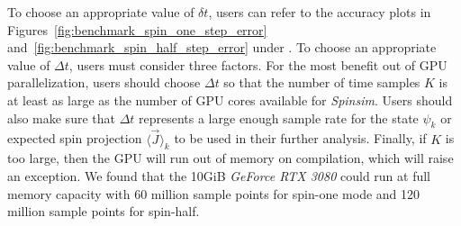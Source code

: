 \documentclass{jors}
\newcommand{\note}[1]{\textcolor{green}{\texttt{[NOTE: #1]}}}
\begin{document}
		To choose an appropriate value of $ \delta t $, users can refer to the accuracy plots in Figures~\ref{fig:benchmark_spin_one_step_error} and~\ref{fig:benchmark_spin_half_step_error} under \emph{}. %
		To choose an appropriate value of $ \Delta t $, users must consider three factors.
		For the most benefit out of GPU parallelization, users should choose $ \Delta t $ so that the number of time samples $ K $ is at least as large as the number of GPU cores available for \emph{Spinsim}.
		Users should also make sure that $ \Delta t $ represents a large enough sample rate for the state $ \psi_k $ or expected spin projection $ \langle \overrightarrow{J}\rangle_k $ to be used in their further analysis.
		Finally, if $ K $ is too large, then the GPU will run out of memory on compilation, which will raise an exception. %
		We found that the 10GiB \emph{GeForce RTX 3080} could run at full memory capacity with 60 million sample points for spin-one mode and 120 million sample points for spin-half.

\end{document}
